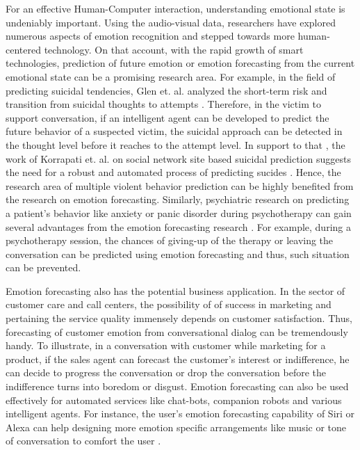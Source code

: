 For an effective Human-Computer interaction, understanding emotional state is undeniably important. Using the audio-visual data, researchers have explored numerous aspects of emotion recognition and stepped towards more human-centered technology\cite{bla2, bla1}. On that account, with the rapid growth of smart technologies, prediction of future emotion or emotion forecasting from the current emotional state can be a promising research area. For example, in the field of predicting suicidal tendencies, Glen et. al. analyzed the short-term risk and transition from suicidal thoughts to attempts \cite{suicide2}. Therefore, in the victim to support conversation, if an intelligent agent can be developed to predict the future behavior of a suspected victim, the suicidal approach can be detected in the thought level before it reaches to the attempt level. In support to that , the work of Korrapati et. al. on social network site based suicidal prediction suggests the need for a robust and automated process of predicting sucides \cite{suicide1}. Hence, the research area of multiple violent behavior prediction can be highly benefited from the research on emotion forecasting. Similarly, psychiatric research on predicting a patient's behavior like anxiety or panic disorder during psychotherapy can gain several advantages from the emotion forecasting research \cite{psy1, psy2}. For example, during a psychotherapy session, the chances of giving-up of the therapy or leaving the conversation can be predicted using emotion forecasting and thus, such situation can be prevented. 

Emotion forecasting also has the potential business application. In the sector of customer care and call centers, the possibility of of success in marketing and pertaining the service quality immensely depends on customer satisfaction. Thus, forecasting of customer emotion from conversational dialog can be tremendously handy. To illustrate, in a conversation with customer while marketing for a product, if the sales agent can forecast the customer's interest or indifference, he can decide to progress the conversation or drop the conversation before the indifference turns into boredom or disgust.  Emotion forecasting can also be used effectively for automated services like chat-bots, companion robots and various intelligent agents. For instance, the user's emotion forecasting capability of Siri or Alexa can help designing more emotion specific arrangements like music or tone of conversation to comfort the user \cite{siri,alexa}.

